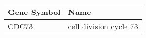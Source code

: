 \begin{tabular}{ll}
\toprule
Gene Symbol &                   Name \\
\midrule
      CDC73 & cell division cycle 73 \\
\bottomrule
\end{tabular}
